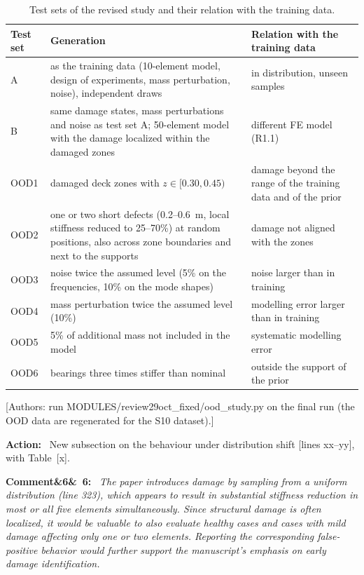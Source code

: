 \documentclass[11pt]{article}
\newenvironment{rcomment}[1]{\par\bigskip\noindent\textbf{Comment\ifx&#1&\else\ #1\fi:}\ \itshape}{\par}
\newenvironment{action}{\par\smallskip\noindent\color{resp}\textbf{Action:}\ }{\par}
\newcommand{\authornote}[1]{\textcolor{note}{\textsf{[Authors: #1]}}}
\newcommand{\tbd}[1]{\textcolor{note}{\textsf{[#1]}}}
\newcommand{\lines}[1]{\tbd{lines #1}}
\begin{document}
\begin{table}[H]
\centering\small
\caption{Test sets of the revised study and their relation with the training data.}
\label{tab:testsets}
\footnotesize
\begin{tabular}{p{2.2cm}p{7.6cm}p{5.0cm}}
\toprule
Test set & Generation & Relation with the training data \\
\midrule
A & as the training data (10-element model, design of experiments, mass perturbation, noise), independent draws &
in distribution, unseen samples \\
B & same damage states, mass perturbations and noise as test set A; 50-element model with the damage localized within the
damaged zones & different FE model (R1.1) \\
\midrule
OOD1 & damaged deck zones with $z\in[0.30,0.45)$ & damage beyond the range of the training data and of the prior \\
OOD2 & one or two short defects (0.2--0.6~m, local stiffness reduced to 25--70\%) at random positions, also across zone
boundaries and next to the supports & damage not aligned with the zones \\
OOD3 & noise twice the assumed level (5\% on the frequencies, 10\% on the mode shapes) & noise larger than in training \\
OOD4 & mass perturbation twice the assumed level (10\%) & modelling error larger than in training \\
OOD5 & 5\% of additional mass not included in the model & systematic modelling error \\
OOD6 & bearings three times stiffer than nominal & outside the support of the prior \\
\bottomrule
\end{tabular}
\end{table}
\authornote{run MODULES/review29oct\_fixed/ood\_study.py on the final run (the OOD data are regenerated for the S10
dataset).}

\begin{action}
New subsection on the behaviour under distribution shift \lines{xx--yy}, with Table~\tbd{x}.
\end{action}

\begin{rcomment}{6}
The paper introduces damage by sampling from a uniform distribution (line 323), which appears to result in substantial
stiffness reduction in most or all five elements simultaneously. Since structural damage is often localized, it would be
valuable to also evaluate healthy cases and cases with mild damage affecting only one or two elements. Reporting the
corresponding false-positive behavior would further support the manuscript's emphasis on early damage identification.
\end{rcomment}
\end{document}
